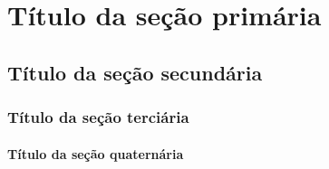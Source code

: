 \chapter[Título da seção primária 
]{Título da seção primária}

\section{Título da seção secundária }
\subsection{Título da seção terciária}
\subsubsection{Título da seção quaternária}

